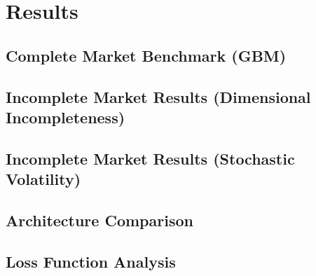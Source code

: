 
\section{Results}
\label{sec:results}


\subsection{Complete Market Benchmark (GBM)}
\label{subsec:gbm_results}


\subsection{Incomplete Market Results (Dimensional Incompleteness)}
\label{subsec:gbm_incomplete_results}


\subsection{Incomplete Market Results (Stochastic Volatility)}
\label{subsec:heston_results}


\subsection{Architecture Comparison}
\label{subsec:architecture_comparison}


\subsection{Loss Function Analysis}
\label{subsec:loss_analysis}

